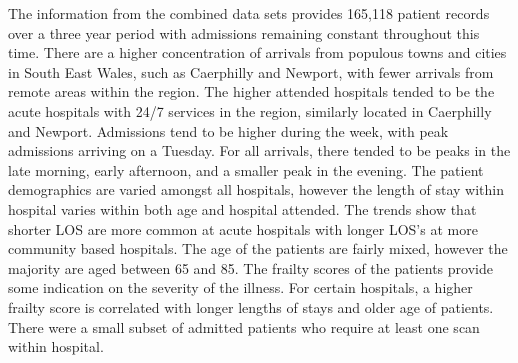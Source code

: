 \documentclass[../thesis.tex]{subfiles}
\begin{document}
The information from the combined data sets provides 165,118 patient records over a three year period with admissions remaining constant throughout this time. There are a higher concentration of arrivals from populous towns and cities in South East Wales, such as Caerphilly and Newport, with fewer arrivals from remote areas within the region. The higher attended hospitals tended to be the acute hospitals with 24/7 services in the region, similarly located in Caerphilly and Newport. Admissions tend to be higher during the week, with peak admissions arriving on a Tuesday. For all arrivals, there tended to be peaks in the late morning, early afternoon, and a smaller peak in the evening. The patient demographics are varied amongst all hospitals, however the length of stay within hospital varies within both age and hospital attended. The trends show that shorter LOS are more common at acute hospitals with longer LOS's at more community based hospitals. The age of the patients are fairly mixed, however the majority are aged between 65 and 85. The frailty scores of the patients provide some indication on the severity of the illness. For certain hospitals, a higher frailty score is correlated with longer lengths of stays and older age of patients. There were a small subset of admitted patients who require at least one scan within hospital.


\end{document}
